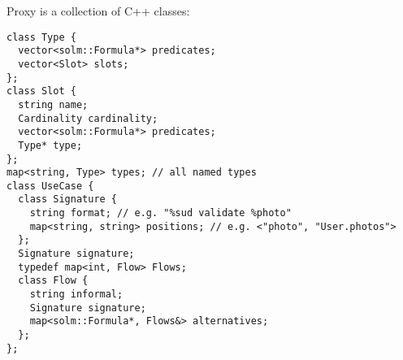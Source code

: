 \documentclass{article}
\begin{document}
    \clearpage
    Proxy is a collection of C++ classes:
    
    \begin{verbatim}
class Type {
  vector<solm::Formula*> predicates;
  vector<Slot> slots;
};
class Slot {
  string name;
  Cardinality cardinality;
  vector<solm::Formula*> predicates;
  Type* type;
};
map<string, Type> types; // all named types
class UseCase {
  class Signature {
    string format; // e.g. "%sud validate %photo"
    map<string, string> positions; // e.g. <"photo", "User.photos">
  };
  Signature signature;
  typedef map<int, Flow> Flows;
  class Flow {
    string informal;
    Signature signature;
    map<solm::Formula*, Flows&> alternatives;
  };
};
\end{verbatim}
\end{document}

